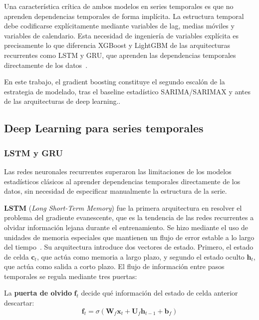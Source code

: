 \documentclass[12pt, a4paper]{article}
\begin{document}
Una característica crítica de ambos modelos en series temporales es que no aprenden dependencias temporales de forma implícita. La estructura temporal debe codificarse explícitamente mediante variables de lag, medias móviles y variables de calendario. Esta necesidad de ingeniería de variables explícita es precisamente lo que diferencia XGBoost y LightGBM de las arquitecturas recurrentes como LSTM y GRU, que aprenden las dependencias temporales directamente de los datos~\cite{jiang2024, chen2016, ke2017}.

En este trabajo, el gradient boosting constituye el segundo escalón de la estrategia de modelado, tras el baseline estadístico SARIMA/SARIMAX y antes de las arquitecturas de deep learning.\cite{ke2017}.

\subsection{Deep Learning para series temporales}

\subsubsection{LSTM y GRU}

Las redes neuronales recurrentes superaron las limitaciones de los modelos estadísticos clásicos al aprender dependencias temporales directamente de los datos, sin necesidad de especificar manualmente la estructura de la serie.

\textbf{LSTM} (\textit{Long Short-Term Memory}) fue la primera arquitectura en resolver el problema del gradiente evanescente, que es la tendencia de las redes recurrentes a olvidar información lejana durante el entrenamiento. Se hizo mediante el uso de unidades de memoria especiales que mantienen un flujo de error estable a lo largo del tiempo~\cite{hochreiter1997}. Su arquitectura introduce dos vectores de estado. Primero, el estado de celda $\mathbf{c}_t$, que actúa como memoria a largo plazo, y segundo el estado oculto $\mathbf{h}_t$, que actúa como salida a corto plazo. El flujo de información entre pasos temporales se regula mediante tres puertas:

La \textbf{puerta de olvido} $\mathbf{f}_t$ decide qué información del estado de celda anterior descartar:
\begin{equation}
\mathbf{f}_t = \sigma(\mathbf{W}_f \mathbf{x}_t + \mathbf{U}_f \mathbf{h}_{t-1} + \mathbf{b}_f)
\end{equation}
\end{document}
